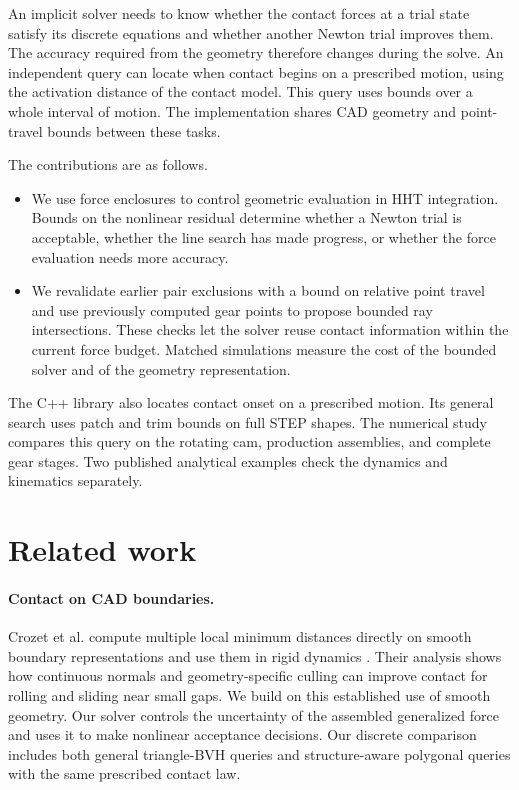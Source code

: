 \documentclass[a4paper,fleqn,longmktitle]{cas-sc}
\begin{document}
An implicit solver needs to know whether the contact forces at a trial state satisfy its discrete equations and whether another Newton trial improves them. The accuracy required from the geometry therefore changes during the solve. An independent query can locate when contact begins on a prescribed motion, using the activation distance of the contact model. This query uses bounds over a whole interval of motion. The implementation shares CAD geometry and point-travel bounds between these tasks.

The contributions are as follows.
\begin{itemize}
\item We use force enclosures to control geometric evaluation in HHT integration. Bounds on the nonlinear residual determine whether a Newton trial is acceptable, whether the line search has made progress, or whether the force evaluation needs more accuracy.
\item We revalidate earlier pair exclusions with a bound on relative point travel and use previously computed gear points to propose bounded ray intersections. These checks let the solver reuse contact information within the current force budget. Matched simulations measure the cost of the bounded solver and of the geometry representation.
\end{itemize}
The C++ library also locates contact onset on a prescribed motion. Its general search uses patch and trim bounds on full STEP shapes. The numerical study compares this query on the rotating cam, production assemblies, and complete gear stages. Two published analytical examples check the dynamics and kinematics separately.

\section{Related work}
\paragraph{Contact on CAD boundaries.}
Crozet et al. compute multiple local minimum distances directly on smooth boundary representations and use them in rigid dynamics \citep{crozet2018}. Their analysis shows how continuous normals and geometry-specific culling can improve contact for rolling and sliding near small gaps. We build on this established use of smooth geometry. Our solver controls the uncertainty of the assembled generalized force and uses it to make nonlinear acceptance decisions. Our discrete comparison includes both general triangle-BVH queries and structure-aware polygonal queries with the same prescribed contact law.
\end{document}
